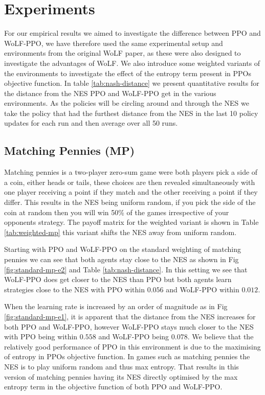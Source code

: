 \documentclass[conference]{IEEEtran}
\begin{document}
\section{Experiments}

For our empirical results we aimed to investigate the difference between PPO and WoLF-PPO, we have therefore used the same experimental setup and environments from the original WoLF paper, as these were also designed to investigate the advantages of WoLF\cite{bowling2002multiagent}. We also introduce some weighted variants of the environments to investigate the effect of the entropy term present in PPOs objective function. In table \ref{tab:nash-distance} we present quantitative results for the distance from the NES PPO and WoLF-PPO get in the various environments. As the policies will be circling around and through the NES we take the policy that had the furthest distance from the NES in the last 10 policy updates for each run and then average over all 50 runs.

\subsection{Matching Pennies (MP)}

Matching pennies is a two-player zero-sum game were both players pick a side of a coin, either heads or tails, these choices are then revealed simultaneously with one player receiving a point if they match and the other receiving a point if they differ. This results in the NES being uniform random, if you pick the side of the coin at random then you will win 50\% of the games irrespective of your opponents strategy. The payoff matrix for the weighted variant is shown in Table \ref{tab:weighted-mp} this variant shifts the NES away from uniform random.

Starting with PPO and WoLF-PPO on the standard weighting of matching pennies we can see that both agents stay close to the NES as shown in Fig \ref{fig:standard-mp-e2} and Table \ref{tab:nash-distance}. In this setting we see that WoLF-PPO does get closer to the NES than PPO but both agents learn strategies close to the NES with PPO within $0.056$ and WoLF-PPO within $0.012$.

When the learning rate is increased by an order of magnitude as in Fig \ref{fig:standard-mp-e1}, it is apparent that the distance from the NES increases for both PPO and WoLF-PPO, however WoLF-PPO stays much closer to the NES with PPO being within $0.558$ and WoLF-PPO being $0.078$. We believe that the relatively good performance of PPO in this environment is due to the maximising of entropy in PPOs objective function. In games such as matching pennies the NES is to play uniform random and thus max entropy. That results in this version of matching pennies having its NES directly optimised by the max entropy term in the objective function of both PPO and WoLF-PPO.
\end{document}
